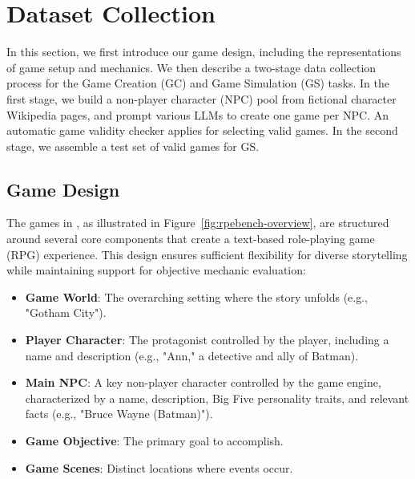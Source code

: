 \section{Dataset Collection}

In this section, we first introduce our game design, including the representations of game setup and mechanics. We then describe a two-stage data collection process for the Game Creation (GC) and Game Simulation (GS) tasks. In the first stage, we build a non-player character (NPC) pool from fictional character Wikipedia pages, and prompt various LLMs to create one game per NPC. An automatic game validity checker applies for selecting valid games. In the second stage, we assemble a test set of valid games for GS.

\subsection{Game Design}\label{sec:gd}



The games in \benchmark{}, as illustrated in Figure~\ref{fig:rpebench-overview}, are structured around several core components that create a text-based role-playing game (RPG) experience. This design ensures sufficient flexibility for diverse storytelling while maintaining support for objective mechanic evaluation:

\begin{itemize} 
\item \textbf{Game World}: The overarching setting where the story unfolds (e.g., "Gotham City"). 
\item \textbf{Player Character}: The protagonist controlled by the player, including a name and description (e.g., "Ann," a detective and ally of Batman). 
\item \textbf{Main NPC}: A key non-player character controlled by the game engine, characterized by a name, description, Big Five personality traits, and relevant facts (e.g., "Bruce Wayne (Batman)"). 
\item \textbf{Game Objective}: The primary goal to accomplish.
\item \textbf{Game Scenes}: Distinct locations where events occur.
\end{itemize}


